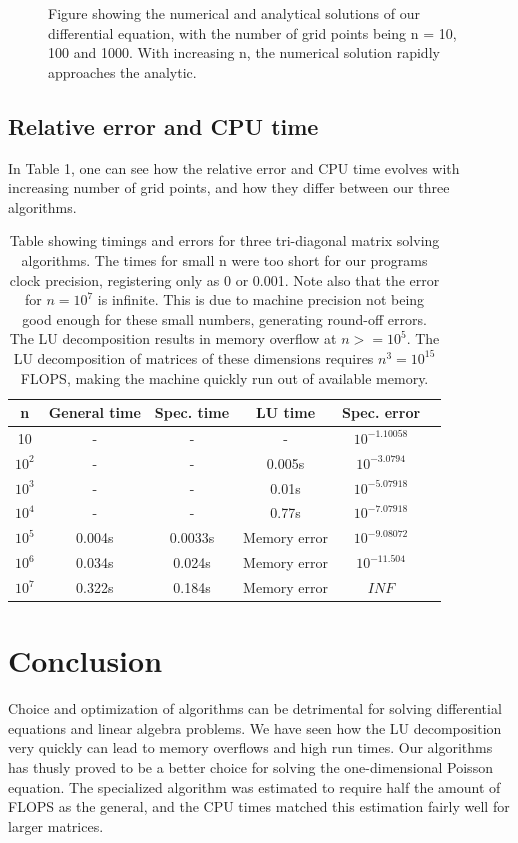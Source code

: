 \documentclass{article}
\begin{document}
\begin{figure}[!h]
\caption{Figure showing the numerical and analytical solutions of our differential equation, with the number of grid points being n = 10, 100 and 1000. With increasing n, the numerical solution rapidly approaches the analytic.}
\label{fig:1)}
\end{figure}

\subsection{Relative error and CPU time}
In Table 1, one can see how the relative error and CPU time evolves with increasing number of grid points, and how they differ between our three algorithms.

\begin{table}[ht]
    \centering
    \begin{tabular}{c|c|c|c|c|c}
         \hline
         n & General time & Spec. time & LU time & Spec. error   \\
         \hline
         10 & - & - & -  &$10^{-1.10058}$ \\
         $10^2$ & - & - & 0.005s  &$10^{-3.0794}$ \\
         $10^3$ & - & - &0.01s  &$10^{-5.07918}$ \\
         $10^4$ & - & - & 0.77s &$10^{-7.07918}$ \\
         $10^5$ & 0.004s&0.0033s & Memory error &$10^{-9.08072}$  \\
         $10^6$ &0.034s &0.024s & Memory error &$10^{-11.504}$  \\
         $10^7$ & 0.322s & 0.184s & Memory error  & $INF$ \\
    \end{tabular}
    \caption{Table showing timings and errors for three tri-diagonal matrix solving algorithms. The times for small n were too short for our programs clock precision, registering only as 0 or 0.001. Note also that the error for $n = 10^7$ is infinite. This is due to machine precision not being good enough for these small numbers, generating round-off errors. The LU decomposition results in memory overflow at $n >= 10^5$. The LU decomposition of matrices of these dimensions requires $n^3 = 10^{15}$ FLOPS, making the machine quickly run out of available memory. }
    \label{tab:my_label}
\end{table}
\section{Conclusion}
Choice and optimization of algorithms can be detrimental for solving differential equations and linear algebra problems. We have seen how the LU decomposition very quickly can lead to memory overflows and high run times. Our algorithms has thusly proved to be a better choice for solving the one-dimensional Poisson equation. The specialized algorithm was estimated to require half the amount of FLOPS as the general, and the CPU times matched this estimation fairly well for larger matrices.
\end{document}
